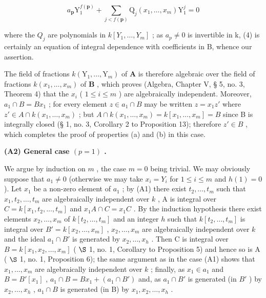 \[
a _ {\mathbf {p}} \mathrm{Y} _ {1} ^ {f (\mathbf {p})} + \sum_ {j <   f (\mathbf {p})} \mathrm{Q} _ {j} (x _ {1}, \dots , x _ {m}) \mathrm{Y} _ {1} ^ {j} = 0\tag{4}
\]

where the \(Q_{j}\) are polynomials in \(k[Y_{1},\ldots,Y_{m}]\) ; as \(a_{p} \neq 0\) is invertible in k, (4) is certainly an equation of integral dependence with coefficients in B, whence our assertion.

The field of fractions \(k(\mathrm{Y}_1, \ldots, \mathrm{Y}_m)\) of \(\mathbf{A}\) is therefore algebraic over the field of fractions \(k(x_1, \ldots, x_m)\) of \(\mathbf{B}\) , which proves (Algebra, Chapter V, § 5, no. 3, Theorem 4) that the \(x_i\) ( \(1 \leqslant i \leqslant m\) ) are algebraically independent. Moreover, \(a_1 \cap B = Bx_1\) ; for every element \(z \in a_1 \cap B\) may be written \(z = x_1z'\) where \(z' \in A \cap k(x_1, \ldots, x_m)\) ; but \(A \cap k(x_1, \ldots, x_m) = k[x_1, \ldots, x_m] = B\) since B is integrally closed (§ 1, no. 3, Corollary 2 to Proposition 13); therefore \(z' \in B\) , which completes the proof of properties (a) and (b) in this case.

\textbf{(A2) General case \((p = 1)\) .}\par

We argue by induction on \(m\) , the case \(m = 0\) being trivial. We may obviously suppose that \(a_1 \neq 0\) (otherwise we may take \(x_i = Y_i\) for \(1 \leqslant i \leqslant m\) and \(h(1) = 0\) ). Let \(x_1\) be a non-zero element of \(a_1\) ; by (A1) there exist \(t_2, \ldots, t_m\) such that \(x_1, t_2, \ldots, t_m\) are algebraically independent over \(k\) , A is integral over \(C = k[x_1, t_2, \ldots, t_m]\) and \(x_1A \cap C = x_1C\) . By the induction hypothesis there exist elements \(x_2, \ldots, x_m\) of \(k[t_2, \ldots, t_m]\) and an integer \(h\) such that \(k[t_2, \ldots, t_m]\) is integral over \(B' = k[x_2, \ldots, x_m]\) , \(x_2, \ldots, x_m\) are algebraically independent over \(k\) and the ideal \(a_1 \cap B'\) is generated by \(x_2, \ldots, x_h\) . Then C is integral over \(B = k[x_1, x_2, \ldots, x_m]\) ( \(\S\) 1, no. 1, Corollary to Proposition 5) and hence so is A ( \(\S\) 1, no. 1, Proposition 6); the same argument as in the case (A1) shows that \(x_1, \ldots, x_m\) are algebraically independent over \(k\) ; finally, as \(x_1 \in a_1\) and \(B = B'[x_1]\) , \(a_1 \cap B = Bx_1 + (a_1 \cap B')\) and, as \(a_1 \cap B'\) is generated (in \(B'\) ) by \(x_2, \ldots, x_h\) , \(a_1 \cap B\) is generated (in B) by \(x_1, x_2, \ldots, x_h\) .

